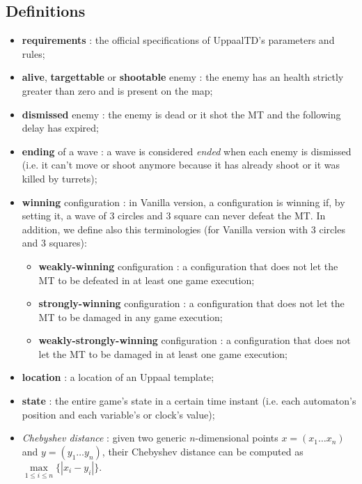 \documentclass[
10pt, %
a4paper, %
oneside, %
headinclude,footinclude, %
BCOR5mm, %
]{scrartcl}
\begin{document}
		\subsection{Definitions}
			\begin{itemize}
				\item \textbf{requirements} : the official specifications of UppaalTD's parameters and rules;
				\item \textbf{alive}, \textbf{targettable} or \textbf{shootable} enemy : the enemy has an health strictly greater than zero and is present on the map;
				\item \textbf{dismissed} enemy : the enemy is dead or it shot the MT and the following delay has expired;
				\item \textbf{ending} of a wave : a wave is considered \emph{ended} when each enemy is dismissed (i.e. it can't move or shoot anymore because it has already shoot or it was killed by turrets);
				\item \textbf{winning} configuration : in Vanilla version, a configuration is winning if, by setting it, a wave of 3 circles and 3 square can never defeat the MT. In addition, we define also this terminologies (for Vanilla version with 3 circles and 3 squares):
					\begin{itemize}
						\item \textbf{weakly-winning} configuration : a configuration that does not let the MT to be defeated in at least one game execution;
						\item \textbf{strongly-winning} configuration : a configuration that does not let the MT to be damaged in any game execution;
						\item \textbf{weakly-strongly-winning} configuration : a configuration that does not let the MT to be damaged in at least one game execution;
					\end{itemize}
				\item \textbf{location} : a location of an Uppaal template;
				\item \textbf{state} : the entire game's state in a certain time instant (i.e. each automaton's position and each variable's or clock's value);
				\item \emph{Chebyshev distance} : given two generic $n$-dimensional points $x=(x_1 \dots x_n)$ and $y=(y_1 \dots y_n)$, their Chebyshev distance can be computed as $\max\limits_{1\leq i\leq n}\{|x_i - y_i|\}$.
			\end{itemize}					
\end{document}
